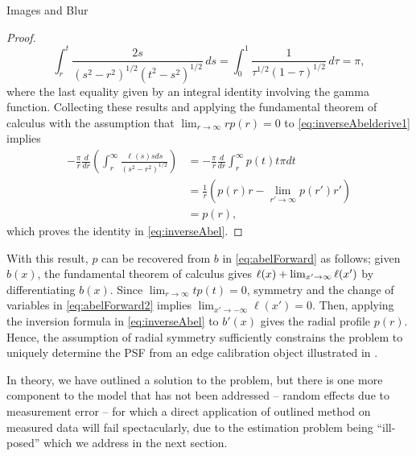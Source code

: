 \begin{chapter}{Images and Blur}
\begin{proof}
\begin{equation}
    \int_r^t \frac{2s}{(s^2 - r^2)^{1/2}(t^2 - s^2)^{1/2}}\,ds
    = \int_0^1 \frac {1}{\tau^{1/2}(1-\tau)^{1/2}}\,d\tau = \pi, \label{eq:gammaIntegral}
  \end{equation}
  where the last equality given by an integral identity involving the gamma function.
  Collecting these results and applying the fundamental theorem of calculus with the assumption that $\lim_{r\to\infty}rp(r) = 0$ to \eqref{eq:inverseAbelderive1} implies
  \begin{align}
    -\frac{\pi}{r} \frac{d}{dr} \left(\int_r^\infty \frac{\ell(s) s ds}{ (s^2 - r^2)^{1/2} } \right) 
      &= -\frac{\pi}{r} \frac{d}{dr} \int_r^\infty p(t) t \pi dt \nonumber\\
      &= \frac{1}{r} \left(p(r)r - \lim_{r'\to\infty}p(r')r'\right) \nonumber\\
      &= p(r),
  \end{align}
  which proves the identity in \eqref{eq:inverseAbel}.
\end{proof}
  
  With this result, $p$ can be recovered from $b$ in \eqref{eq:abelForward} as follows; given $b(x)$, the fundamental theorem of calculus gives $\ell(x) + \lim_{x'\to\-\infty}\ell(x')$ by differentiating $b(x)$.
  Since $\lim_{r\to\infty}tp(t) = 0$, symmetry and the change of variables in \eqref{eq:abelForward2} implies $\lim_{x'\to-\infty}\ell(x') = 0$. 
  Then, applying the inversion formula in \eqref{eq:inverseAbel} to $b'(x)$ gives the radial profile $p(r)$.
  Hence, the assumption of radial symmetry sufficiently constrains the problem to uniquely determine the PSF from an edge calibration object illustrated in .

  In theory, we have outlined a solution to the problem, but there is one more component to the model that has not been addressed -- random effects due to measurement error -- for which a direct application of outlined method on measured data will fail spectacularly, due to the estimation problem being ``ill-posed'' which we address in the next section.


\end{chapter}
